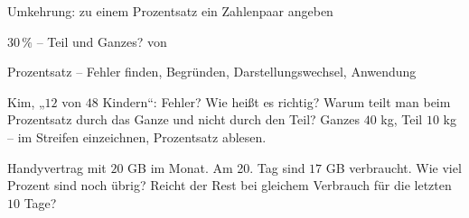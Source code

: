 \begin{aufgabe}{Umkehrung: zu einem Prozentsatz ein Zahlenpaar angeben}
\begin{teile}
\teil $30\,\%$ – Teil und Ganzes? \leerfeld von \leerfeld
\end{teile}
\end{aufgabe}

\begin{aufgabe}{Prozentsatz – Fehler finden, Begründen, Darstellungswechsel, Anwendung}
\begin{teile}
\teil Kim, „$12$ von $48$ Kindern“:  Fehler? Wie heißt es richtig?
\teil Warum teilt man beim Prozentsatz durch das Ganze und nicht durch den Teil?
\teil Ganzes $40$ kg, Teil $10$ kg – im Streifen einzeichnen, Prozentsatz ablesen.

\streifenleer[4]
\leerfeld[\%]
\teil Handyvertrag mit $20$ GB im Monat. Am 20. Tag sind $17$ GB verbraucht. Wie viel Prozent sind noch übrig? Reicht der Rest bei gleichem Verbrauch für die letzten $10$ Tage?
\end{teile}
\end{aufgabe}
